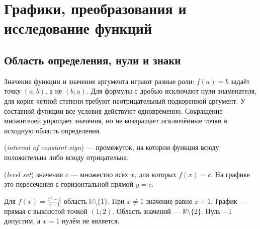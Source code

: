 \chapter{Графики, преобразования и исследование функций}\label{chap:exam-functions}
\section{Область определения, нули и знаки}
Значение функции и значение аргумента играют разные роли: \(f(a)=b\) задаёт точку \((a;b)\), а не \((b;a)\). Для формулы с дробью исключают нули знаменателя, для корня чётной степени требуют неотрицательный подкоренной аргумент. У составной функции все условия действуют одновременно. Сокращение множителей упрощает значения, но не возвращает исключённые точки в исходную область определения.
\begin{definition} (\emph{interval of constant sign}) --- промежуток, на котором функция всюду положительна либо всюду отрицательна. \par{} (\emph{level set}) значения \(c\) --- множество всех \(x\), для которых \(f(x)=c\). На графике это пересечения с горизонтальной прямой \(y=c\).\end{definition}
\begin{example}Для \(f(x)=\frac{x^2-1}{x-1}\) область \(\mathbb R\setminus\{1\}\). При \(x\ne1\) значение равно \(x+1\). График --- прямая с выколотой точкой \((1;2)\). Область значений --- \(\mathbb R\setminus\{2\}\). Нуль \(-1\) допустим, а \(x=1\) нулём не является.\end{example}
